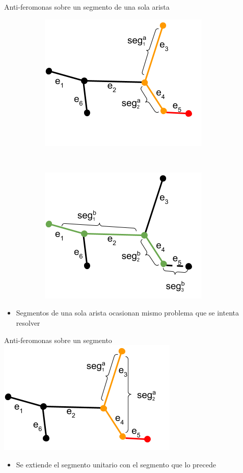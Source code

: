 \begin{frame}{Anti-feromonas sobre un segmento de una sola arista}
\centering
\begin{figure}
  \begin{subfigure}[t]{0.48\textwidth}
    \includegraphics[scale=0.5]{Pictures/ant_segments_complex_case_B2.png}
  \end{subfigure}%
    ~ \hspace{0.1cm}
    \begin{subfigure}[t]{0.48\textwidth}
    \includegraphics[scale=0.5]{Pictures/ant_segments_complex_case_B_blocked.png}
    \end{subfigure}
\end{figure}
\begin{itemize}
    \item Segmentos de una sola arista ocasionan mismo problema que se intenta resolver
\end{itemize}
\end{frame}

\begin{frame}{Anti-feromonas sobre un segmento}
\centering
    \includegraphics[scale=0.5]{Pictures/ant_segments_complex_case_B2_extended.png}
    \begin{itemize}
        \item Se extiende el segmento unitario con el segmento que lo precede
    \end{itemize}
\end{frame}

